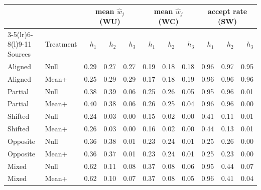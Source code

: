 \begin{tabular}{@{}llrrrrrrrrr@{}}
\toprule
 & & \multicolumn{3}{c}{mean $\hat w_j$ (WU)} & \multicolumn{3}{c}{mean $\hat w_j$ (WC)} & \multicolumn{3}{c}{accept rate (SW)}\\
\cmidrule(lr){3-5}\cmidrule(lr){6-8}\cmidrule(l){9-11}
Sources & Treatment & $h_1$ & $h_2$ & $h_3$ & $h_1$ & $h_2$ & $h_3$ & $h_1$ & $h_2$ & $h_3$\\
\midrule
Aligned & Null & 0.29 & 0.27 & 0.27 & 0.19 & 0.18 & 0.18 & 0.96 & 0.97 & 0.95\\
Aligned & Mean+ & 0.25 & 0.29 & 0.29 & 0.17 & 0.18 & 0.19 & 0.96 & 0.96 & 0.96\\
Partial & Null & 0.38 & 0.39 & 0.06 & 0.25 & 0.26 & 0.05 & 0.95 & 0.96 & 0.01\\
Partial & Mean+ & 0.40 & 0.38 & 0.06 & 0.26 & 0.25 & 0.04 & 0.96 & 0.96 & 0.00\\
Shifted & Null & 0.24 & 0.03 & 0.00 & 0.15 & 0.02 & 0.00 & 0.41 & 0.11 & 0.01\\
Shifted & Mean+ & 0.26 & 0.03 & 0.00 & 0.16 & 0.02 & 0.00 & 0.44 & 0.13 & 0.01\\
Opposite & Null & 0.36 & 0.38 & 0.01 & 0.23 & 0.24 & 0.01 & 0.25 & 0.26 & 0.00\\
Opposite & Mean+ & 0.36 & 0.37 & 0.01 & 0.23 & 0.24 & 0.01 & 0.25 & 0.23 & 0.00\\
Mixed & Null & 0.62 & 0.11 & 0.08 & 0.37 & 0.08 & 0.06 & 0.95 & 0.44 & 0.07\\
Mixed & Mean+ & 0.62 & 0.10 & 0.07 & 0.37 & 0.08 & 0.05 & 0.96 & 0.41 & 0.04\\
\bottomrule
\end{tabular}